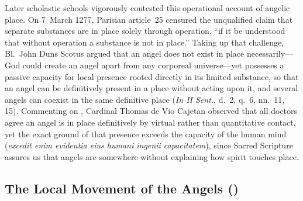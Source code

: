 Later scholastic schools vigorously contested this operational account of angelic place. On 7~March 1277, Parisian article~25 censured the unqualified claim that separate substances are in place solely through operation, ``if it be understood that without operation a substance is not in place.'' Taking up that challenge, Bl.~John Duns Scotus argued that an angel does not exist in place necessarily---God could create an angel apart from any corporeal universe---yet possesses a passive capacity for local presence rooted directly in its limited substance, so that an angel can be definitively present in a place without acting upon it, and several angels can coexist in the same definitive place (\emph{In II Sent.}, d.~2, q.~6, nn.~11, 15). Commenting on , Cardinal Thomas de Vio Cajetan observed that all doctors agree an angel is in place definitively by virtual rather than quantitative contact, yet the exact ground of that presence exceeds the capacity of the human mind (\emph{excedit enim evidentia eius humani ingenii capacitatem}), since Sacred Scripture assures us that angels are somewhere without explaining how spirit touches place.


\subsection{The Local Movement of the Angels ()}

